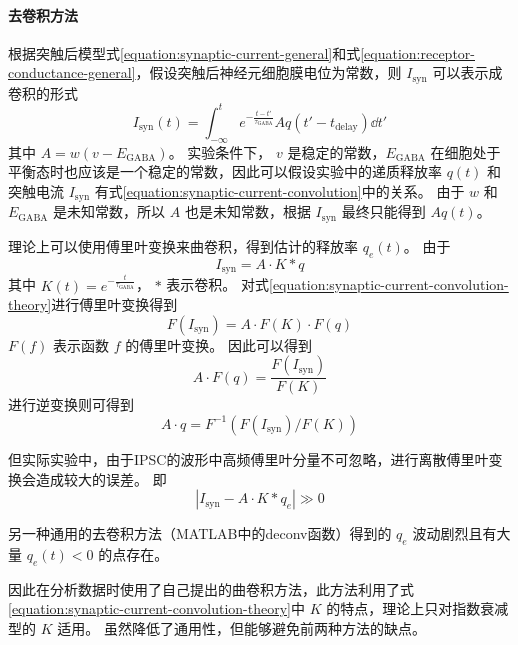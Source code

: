 \paragraph{去卷积方法}
根据突触后模型式\ref{equation:synaptic-current-general}和式\ref{equation:receptor-conductance-general}，假设突触后神经元细胞膜电位为常数，则 $I_\text{syn}$ 可以表示成卷积的形式
\begin{equation}
I_\text{syn}(t) = \int_{-\infty}^t e^{-\frac{t - t'}{\tau_\text{GABA}}} A q(t' - t_\text{delay}) \dd{t'}
\label{equation:synaptic-current-convolution}
\end{equation}
其中 $A = w(v - E_\text{GABA})$。
实验条件下， $v$ 是稳定的常数，$E_\text{GABA}$ 在细胞处于平衡态时也应该是一个稳定的常数，因此可以假设实验中的递质释放率 $q(t)$ 和 突触电流 $I_\text{syn}$ 有式\ref{equation:synaptic-current-convolution}中的关系。
由于 $w$ 和 $E_\text{GABA}$ 是未知常数，所以 $A$ 也是未知常数，根据 $I_\text{syn}$ 最终只能得到 $Aq(t)$。

理论上可以使用傅里叶变换来曲卷积，得到估计的释放率 $q_e(t)$。
由于
\begin{equation}
I_\text{syn} = A \cdot K * q
\label{equation:synaptic-current-convolution-theory}
\end{equation}
其中 $K(t) = e^{-\frac{t}{\tau_\text{GABA}}}$， $*$ 表示卷积。
对式\ref{equation:synaptic-current-convolution-theory}进行傅里叶变换得到
\begin{equation}
F(I_\text{syn}) = A \cdot F(K) \cdot F(q)
\label{equation:synaptic-current-fourier-transformation}
\end{equation}
$F(f)$ 表示函数 $f$ 的傅里叶变换。
因此可以得到
\begin{equation}
A \cdot F(q) = \frac{F(I_\text{syn})}{F(K)}
\label{equation:release-rate-fourier}
\end{equation}
进行逆变换则可得到
\begin{equation}
A \cdot q = F^{-1}\left( F(I_\text{syn}) / F(K) \right)
\end{equation}

但实际实验中，由于IPSC的波形中高频傅里叶分量不可忽略，进行离散傅里叶变换会造成较大的误差。
即
\begin{equation}
\left| I_\text{syn} - A \cdot K * q_e \right| \gg 0
\label{equation:deconvolution-error}
\end{equation}

另一种通用的去卷积方法（MATLAB中的deconv函数）得到的 $q_e$ 波动剧烈且有大量 $q_e(t) < 0$ 的点存在。

因此在分析数据时使用了自己提出的曲卷积方法，此方法利用了式\ref{equation:synaptic-current-convolution-theory}中 $K$ 的特点，理论上只对指数衰减型的 $K$ 适用。
虽然降低了通用性，但能够避免前两种方法的缺点。

